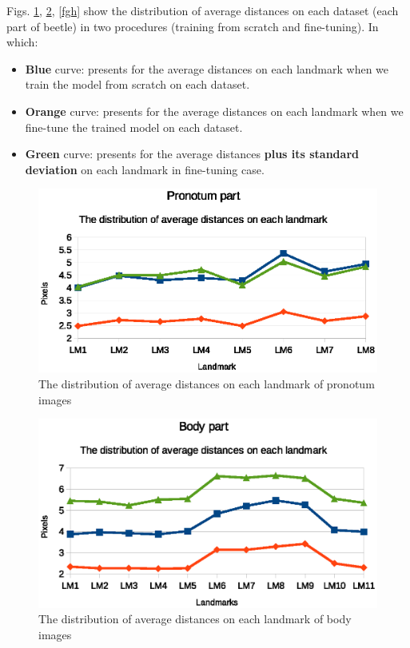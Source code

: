 \documentclass[12pt,a4paper]{article}
\begin{document}
Figs. \ref{fgp}, \ref{fgb}, \ref{fgh} show the distribution of average distances on each dataset (each part of beetle) in two procedures (training from scratch and fine-tuning). In which: 
\begin{itemize}
	\item \textbf{Blue} curve: presents for the average distances on each landmark when we train the model from scratch on each dataset.
	\item \textbf{Orange} curve: presents for the average distances on each landmark when we fine-tune the trained model on each dataset.
	\item \textbf{Green} curve: presents for the average distances \textbf{plus its standard deviation} on each landmark in fine-tuning case.
\end{itemize}
\begin{figure}[h!]
	\centering
	\includegraphics[scale=1]{images/fine_tuning/prono_part}
	\caption{The distribution of average distances on each landmark of pronotum images}
	\label{fgp}
\end{figure}

\begin{figure}[h!]
	\centering
	\includegraphics[scale=1]{images/fine_tuning/body_part}
	\caption{The distribution of average distances on each landmark of body images}
	\label{fgb}
\end{figure}
\end{document}
